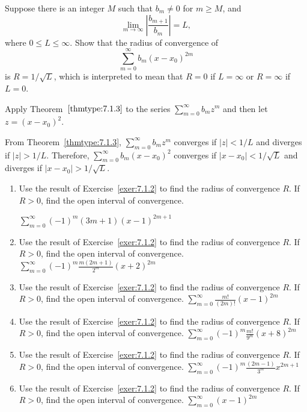 \documentclass{ximera}
\begin{document}
\begin{problem}\label{exer:7.1.2}
Suppose there is an integer $M$ such that $b_m\ne0$ for $m\ge M$,  and
$$
\lim_{m\to\infty}\left|\frac{b_{m+1}}{b_m}\right|=L,
$$
where $0\le L\le\infty$. Show that the radius of convergence of
$$
\sum_{m=0}^\infty b_m(x-x_0)^{2m}
$$
is $R=1/\sqrt L$,
which is interpreted to mean that $R=0$ if $L=\infty$ or
$R=\infty$ if $L=0$.
\begin{hint}
 Apply Theorem~$\ref{thmtype:7.1.3}$ to the series $\sum_{m=0}^\infty
b_mz^m$ and then let $z=(x-x_0)^2$.   
\end{hint}

\begin{solution}
    From Theorem~\ref{thmtype:7.1.3}, $\sum_{m=0}^\infty b_mz^m$ converges
if $|z|<1/L$ and diverges if $|z|>1/L$.
 Therefore,
$\sum_{m=0}^\infty b_m(x-x_0)^2$ converges if $|x-x_0|<1/\sqrt{L}$
and diverges if $|x-x_0|>1/\sqrt{L}$.
\end{solution}
\end{problem}

\begin{problem}\label{exer:7.1.3}
\begin{enumerate}

\item Use the result of Exercise~\ref{exer:7.1.2} to find the radius of convergence $R$. If $R>0$, find the open interval of convergence.

$\sum_{m=0}^\infty (-1)^m(3m+1)(x-1)^{2m+1}$

\item Use the result of Exercise~\ref{exer:7.1.2} to find the radius of convergence $R$. If $R>0$, find the open interval of convergence.
$\sum_{m=0}^\infty (-1)^m\frac{m(2m+1)}{2^m}(x+2)^{2m}$ 

\item Use the result of Exercise~\ref{exer:7.1.2} to find the radius of convergence $R$. If $R>0$, find the open interval of convergence.
$\sum_{m=0}^\infty \frac{m!}{(2m)!}(x-1)^{2m}$

\item Use the result of Exercise~\ref{exer:7.1.2} to find the radius of convergence $R$. If $R>0$, find the open interval of convergence.
$\sum_{m=0}^\infty (-1)^m\frac{m!}{9^m}(x+8)^{2m}$

\item Use the result of Exercise~\ref{exer:7.1.2} to find the radius of convergence $R$. If $R>0$, find the open interval of convergence.
$\sum_{m=0}^\infty(-1)^m\frac{(2m-1)}{3^m}x^{2m+1}$

\item Use the result of Exercise~\ref{exer:7.1.2} to find the radius of convergence $R$. If $R>0$, find the open interval of convergence.
$\sum_{m=0}^\infty(x-1)^{2m}$

\end{enumerate}
\end{problem}
\end{document}
